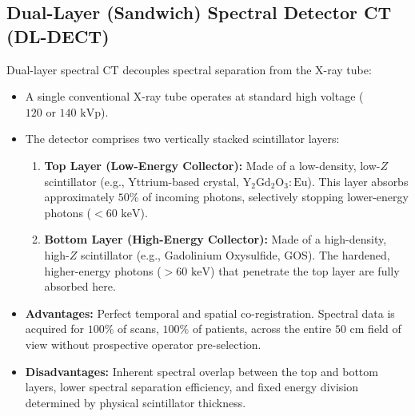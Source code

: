 \documentclass[11pt,a4paper]{article}
\begin{document}
\subsection{Dual-Layer (Sandwich) Spectral Detector CT (DL-DECT)}
Dual-layer spectral CT decouples spectral separation from the X-ray tube:
\begin{itemize}[leftmargin=2em]
    \item A single conventional X-ray tube operates at standard high voltage ($120\text{ or }140\text{ kVp}$).
    \item The detector comprises two vertically stacked scintillator layers:
    \begin{enumerate}
        \item \textbf{Top Layer (Low-Energy Collector):} Made of a low-density, low-$Z$ scintillator (e.g., Yttrium-based crystal, $\text{Y}_2\text{Gd}_2\text{O}_3:\text{Eu}$). This layer absorbs approximately $50\%$ of incoming photons, selectively stopping lower-energy photons ($< 60\text{ keV}$).
        \item \textbf{Bottom Layer (High-Energy Collector):} Made of a high-density, high-$Z$ scintillator (e.g., Gadolinium Oxysulfide, GOS). The hardened, higher-energy photons ($> 60\text{ keV}$) that penetrate the top layer are fully absorbed here.
    \end{enumerate}
    \item \textbf{Advantages:} Perfect temporal and spatial co-registration. Spectral data is acquired for $100\%$ of scans, $100\%$ of patients, across the entire $50\text{ cm}$ field of view without prospective operator pre-selection.
    \item \textbf{Disadvantages:} Inherent spectral overlap between the top and bottom layers, lower spectral separation efficiency, and fixed energy division determined by physical scintillator thickness.
\end{itemize}
\end{document}
